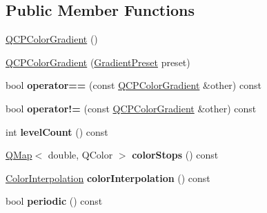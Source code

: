 \subsection*{Public Member Functions}
\begin{DoxyCompactItemize}
\item 
\hyperlink{class_q_c_p_color_gradient_a96bcc490ff9dc32b22941ce00800bce0}{Q\+C\+P\+Color\+Gradient} ()
\item 
\hyperlink{class_q_c_p_color_gradient_a4e570b4004fd60bd135e52d685ed2b66}{Q\+C\+P\+Color\+Gradient} (\hyperlink{class_q_c_p_color_gradient_aed6569828fee337023670272910c9072}{Gradient\+Preset} preset)
\item 
bool {\bfseries operator==} (const \hyperlink{class_q_c_p_color_gradient}{Q\+C\+P\+Color\+Gradient} \&other) const \hypertarget{class_q_c_p_color_gradient_aada47d8206bf2cec77462653bf471c13}{}\label{class_q_c_p_color_gradient_aada47d8206bf2cec77462653bf471c13}

\item 
bool {\bfseries operator!=} (const \hyperlink{class_q_c_p_color_gradient}{Q\+C\+P\+Color\+Gradient} \&other) const \hypertarget{class_q_c_p_color_gradient_ac641f5d2dc1686201d3cb602c871791d}{}\label{class_q_c_p_color_gradient_ac641f5d2dc1686201d3cb602c871791d}

\item 
int {\bfseries level\+Count} () const \hypertarget{class_q_c_p_color_gradient_ae7537a8e6d0fed3f1928328062bb0f4e}{}\label{class_q_c_p_color_gradient_ae7537a8e6d0fed3f1928328062bb0f4e}

\item 
\hyperlink{class_q_map}{Q\+Map}$<$ double, Q\+Color $>$ {\bfseries color\+Stops} () const \hypertarget{class_q_c_p_color_gradient_a64f8aba7826f9c6363aacff8376cef37}{}\label{class_q_c_p_color_gradient_a64f8aba7826f9c6363aacff8376cef37}

\item 
\hyperlink{class_q_c_p_color_gradient_ac5dca17cc24336e6ca176610e7f77fc1}{Color\+Interpolation} {\bfseries color\+Interpolation} () const \hypertarget{class_q_c_p_color_gradient_a731616fabe6f2e33f71f58dd382359d8}{}\label{class_q_c_p_color_gradient_a731616fabe6f2e33f71f58dd382359d8}

\item 
bool {\bfseries periodic} () const \hypertarget{class_q_c_p_color_gradient_a860b7048f877195d2a0fb8d5a7cf5d73}{}\label{class_q_c_p_color_gradient_a860b7048f877195d2a0fb8d5a7cf5d73}


\end{DoxyCompactItemize}
